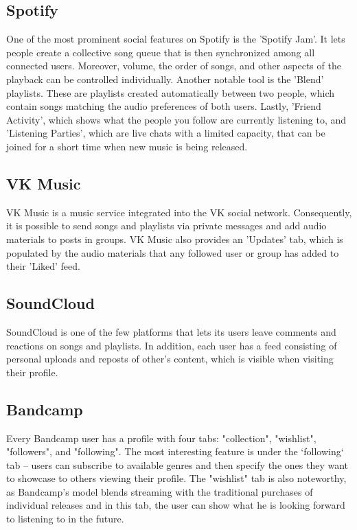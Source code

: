 \subsection{Spotify}
One of the most prominent social features on Spotify is the 'Spotify Jam'\cite{spotify_jam}.
It lets people create a collective song queue that is then synchronized among all connected users.
Moreover, volume, the order of songs, and other aspects of the playback can be controlled individually.
Another notable tool is the 'Blend' playlists\cite{spotify_recs}. These are playlists created automatically
between two people, which contain songs matching the audio preferences of both users.
Lastly, 'Friend Activity'\cite{spotify_friend_activ}, which shows what the people you follow are currently listening to,
and 'Listening Parties', which are live chats with a limited capacity,
that can be joined for a short time when new music is being released\cite{spotify_party_1,spotify_party_2}.

\subsection{VK Music}
VK Music is a music service integrated into the VK social network.
Consequently, it is possible to send songs and playlists via private messages and add audio materials to
posts in groups. VK Music also provides an 'Updates' tab, which is populated by the audio materials that
any followed user or group has added to their 'Liked' feed.

\subsection{SoundCloud}
SoundCloud is one of the few platforms that lets its users leave comments
and reactions on songs and playlists\cite{sc_comments,sc_reactions}.
In addition, each user has a feed consisting of personal uploads and
reposts of other's content\cite{sc_reposts}, which is visible when visiting their profile.

\subsection{Bandcamp}
Every Bandcamp user has a profile with four tabs: "collection", "wishlist", "followers", and "following".
The most interesting feature is under the `following` tab -- users can subscribe to available genres and then
specify the ones they want to showcase to others viewing their profile.
The "wishlist" tab is also noteworthy,
as Bandcamp’s model blends streaming with the traditional purchases of individual releases and
in this tab, the user can show what he is looking forward to listening to in the future.

